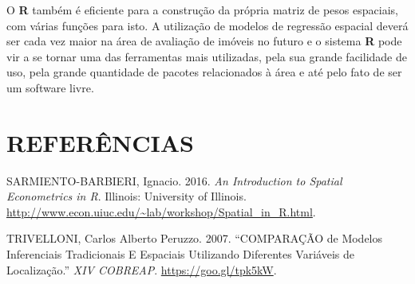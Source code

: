 \documentclass[12pt,]{article}
\begin{document}
O \textbf{R} também é eficiente para a construção da própria matriz de
pesos espaciais, com várias funções para isto. A utilização de modelos
de regressão espacial deverá ser cada vez maior na área de avaliação de
imóveis no futuro e o sistema \textbf{R} pode vir a se tornar uma das
ferramentas mais utilizadas, pela sua grande facilidade de uso, pela
grande quantidade de pacotes relacionados à área e até pelo fato de ser
um software livre.

\section*{REFERÊNCIAS}\label{referencias}

\hypertarget{refs}{}
\hypertarget{ref-sarmiento-barbieri}{}
SARMIENTO-BARBIERI, Ignacio. 2016. \emph{An Introduction to Spatial
Econometrics in R}. Illinois: University of Illinois.
\url{http://www.econ.uiuc.edu/~lab/workshop/Spatial_in_R.html}.

\hypertarget{ref-trivelloni07}{}
TRIVELLONI, Carlos Alberto Peruzzo. 2007. ``COMPARAÇÃO de Modelos
Inferenciais Tradicionais E Espaciais Utilizando Diferentes Variáveis de
Localização.'' \emph{XIV COBREAP}. \url{https://goo.gl/tpk5kW}.
\end{document}
